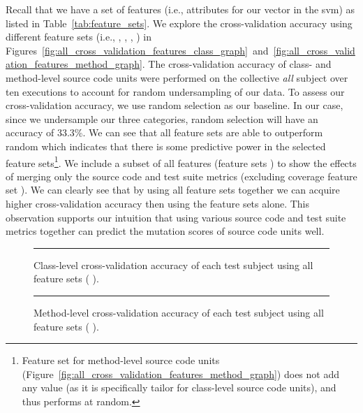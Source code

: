 Recall that we have a set of features (i.e., attributes for our vector in the \gls{svm}) as listed in Table~\ref{tab:feature_sets}. We explore the cross-validation accuracy using different feature sets (i.e., , , , ) in Figures~\ref{fig:all_cross_validation_features_class_graph}~and~\ref{fig:all_cross_validation_features_method_graph}. The cross-validation accuracy of class- and method-level source code units were performed on the collective \emph{all} subject over ten executions to account for random undersampling of our data. To assess our cross-validation accuracy, we use random selection as our baseline. In our case, since we undersample our three categories, random selection will have an accuracy of 33.3\%. We can see that all feature sets are able to outperform random which indicates that there is some predictive power in the selected feature sets\footnote{Feature set  for method-level source code units (Figure~\ref{fig:all_cross_validation_features_method_graph}) does not add any value (as it is specifically tailor for class-level source code units), and thus performs at random.}. We include a subset of all features (feature sets   ) to show the effects of merging only the source code and test suite metrics (excluding coverage feature set ). We can clearly see that by using all feature sets together we can acquire higher cross-validation accuracy then using the feature sets alone. This observation supports our intuition that using various source code and test suite metrics together can predict the mutation scores of source code units well.

\begin{figure}[!tb]
  \centering
  \begin{adjustbox}{max size={.95\textwidth}{.95\textheight}}
    
  \end{adjustbox}
  \caption{Class-level cross-validation accuracy of each test subject using all feature sets (   ).}
  \vspace{2mm}
  \hrule
  \label{fig:individual_cross_validation_class_1_2_3_4_graph}
\end{figure}

\begin{figure}[!tb]
  \centering
  \begin{adjustbox}{max size={.95\textwidth}{.95\textheight}}
    
  \end{adjustbox}
  \caption{Method-level cross-validation accuracy of each test subject using all feature sets (   ).}
  \vspace{2mm}
  \hrule
  \label{fig:individual_cross_validation_method_1_2_3_4_graph}
\end{figure}

